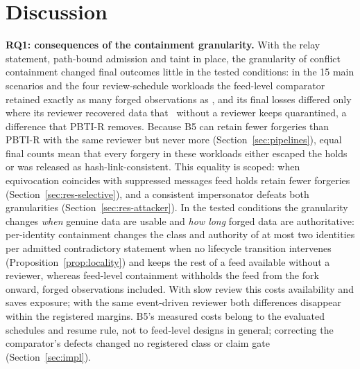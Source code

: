 
\section{Discussion}\label{sec:discussion}

\textbf{RQ1: consequences of the containment granularity.} With the relay statement, path-bound admission and taint in place, the granularity of conflict containment changed final outcomes little in the tested conditions: in the 15 main scenarios and the four review-schedule workloads the feed-level comparator retained exactly as many forged observations as \sys, and its final losses differed only where its reviewer recovered data that \sys\ without a reviewer keeps quarantined, a difference that PBTI-R removes. Because B5 can retain fewer forgeries than PBTI-R with the same reviewer but never more (Section~\ref{sec:pipelines}), equal final counts mean that every forgery in these workloads either escaped the holds or was released as hash-link-consistent. This equality is scoped: when equivocation coincides with suppressed messages feed holds retain fewer forgeries (Section~\ref{sec:res-selective}), and a consistent impersonator defeats both granularities (Section~\ref{sec:res-attacker}). In the tested conditions the granularity changes \emph{when} genuine data are usable and \emph{how long} forged data are authoritative: per-identity containment changes the class and authority of at most two identities per admitted contradictory statement when no lifecycle transition intervenes (Proposition~\ref{prop:locality}) and keeps the rest of a feed available without a reviewer, whereas feed-level containment withholds the feed from the fork onward, forged observations included. With slow review this costs availability and saves exposure; with the same event-driven reviewer both differences disappear within the registered margins. B5's measured costs belong to the evaluated schedules and resume rule, not to feed-level designs in general; correcting the comparator's defects changed no registered class or claim gate (Section~\ref{sec:impl}).

